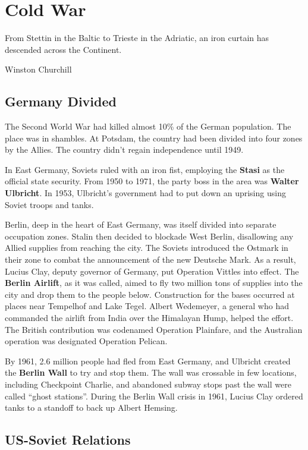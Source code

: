 \chapter{Cold War}

\epigraph{%
  From Stettin in the Baltic to Trieste in the Adriatic, an iron curtain has descended across the Continent.
}{Winston Churchill}

\section{Germany Divided}

The Second World War had killed almost 10\% of the German population.
The place was in shambles.
At Potsdam, the country had been divided into four zones by the Allies.
The country didn't regain independence until 1949.

In East Germany, Soviets ruled with an iron fist, employing the \textbf{Stasi} as the official state security.
From 1950 to 1971, the party boss in the area was \textbf{Walter Ulbricht}.
In 1953, Ulbricht's government had to put down an uprising using Soviet troops and tanks.

Berlin, deep in the heart of East Germany, was itself divided into separate occupation zones.
Stalin then decided to blockade West Berlin, disallowing any Allied supplies from reaching the city.
The Soviets introduced the Ostmark in their zone to combat the announcement of the new Deutsche Mark.
As a result, Lucius Clay, deputy governor of Germany, put Operation Vittles into effect.
The \textbf{Berlin Airlift}, as it was called,
aimed to fly two million tons of supplies into the city and drop them to the people below.
Construction for the bases occurred at places near Tempelhof and Lake Tegel.
Albert Wedemeyer, a general who had commanded the airlift from India over the Himalayan Hump, helped the effort.
The British contribution was codenamed Operation Plainfare,
and the Australian operation was designated Operation Pelican.

By 1961, 2.6 million people had fled from East Germany,
and Ulbricht created the \textbf{Berlin Wall} to try and stop them.
The wall was crossable in few locations, including Checkpoint Charlie,
and abandoned subway stops past the wall were called ``ghost stations''.
During the Berlin Wall crisis in 1961, Lucius Clay ordered tanks to a standoff to back up Albert Hemsing.

\section{US-Soviet Relations}

